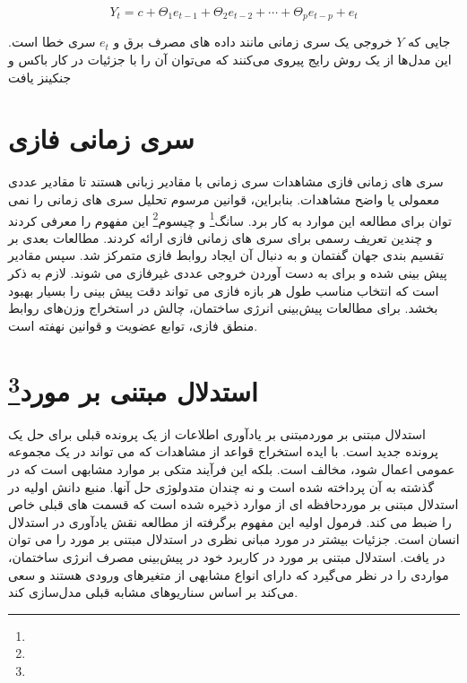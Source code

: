     \begin{equation}\label{eq:q}
        Y_t = c + \Theta_1 e_{t-1} + \Theta_2 e_{t-2} + \cdots + \Theta_p e_{t-p} + e_t
    \end{equation}

    جایی که $Y$ خروجی یک سری زمانی مانند داده های مصرف برق و $e_t$ سری خطا است. این مدل‌ها از یک روش رایج پیروی می‌کنند که 
    می‌توان آن را با جزئیات در کار باکس و جنکینز یافت
    \cite{box2015time}
\section{سری زمانی فازی}
سری های زمانی فازی مشاهدات سری زمانی با مقادیر زبانی هستند تا مقادیر عددی معمولی یا واضح مشاهدات.
 بنابراین، قوانین مرسوم تحلیل سری های زمانی را نمی توان برای مطالعه این موارد به کار برد. سانگ\footnote{} و چیسوم\footnote{} \cite{song1993fuzzy} این مفهوم را معرفی کردند و چندین تعریف رسمی برای سری های زمانی فازی ارائه کردند. 
 مطالعات بعدی بر تقسیم بندی جهان گفتمان و به دنبال آن ایجاد روابط فازی متمرکز شد. سپس مقادیر پیش بینی شده و برای به دست آوردن خروجی عددی غیرفازی می شوند. 
 لازم به ذکر است که انتخاب مناسب طول هر بازه فازی می تواند دقت پیش بینی را بسیار بهبود بخشد.
  برای مطالعات پیش‌بینی انرژی ساختمان، چالش در استخراج وزن‌های روابط منطق فازی، توابع عضویت و قوانین نهفته است.
\section{استدلال مبتنی بر مورد\footnote{}}

استدلال مبتنی بر مورد\footnotemark[5] مبتنی بر یادآوری اطلاعات از یک پرونده قبلی برای حل یک پرونده جدید است. با ایده استخراج قواعد از مشاهدات که می تواند در یک مجموعه عمومی اعمال شود، مخالف است.
 بلکه این فرآیند متکی بر موارد مشابهی است 
 که در گذشته به آن پرداخته شده است و نه چندان متدولوژی حل آنها.
  منبع دانش اولیه در استدلال مبتنی بر مورد\footnotemark[5] حافظه ای از موارد ذخیره شده است که قسمت های قبلی خاص را ضبط می کند\cite{leake1996cbr}. 
 فرمول اولیه این مفهوم برگرفته از مطالعه نقش یادآوری در استدلال انسان است\cite{schank1983dynamic}. 
 جزئیات بیشتر در مورد مبانی نظری در استدلال مبتنی بر مورد را می توان در \cite{aamodt1994case} یافت.
 استدلال مبتنی بر مورد در کاربرد خود در پیش‌بینی مصرف انرژی ساختمان، مواردی را در نظر می‌گیرد که دارای انواع مشابهی از متغیرهای ورودی هستند
  و سعی می‌کند بر اساس سناریوهای مشابه قبلی مدل‌سازی کند.


